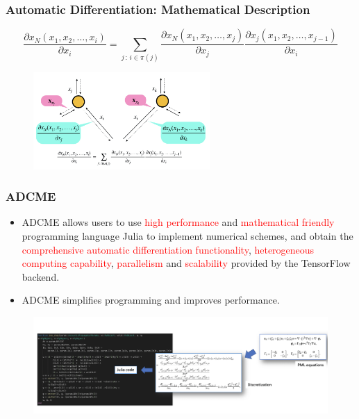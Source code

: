 \documentclass{beamer}
\begin{document}
\begin{frame}
	\frametitle{Automatic Differentiation: Mathematical Description}
\begin{theorem}
	$$\frac{\partial x_N(x_1, x_2, \ldots, x_{i})}{\partial x_i} = \sum_{j\,:\,i\in \pi(j)}
    \frac{\partial x_N(x_1, x_2, \ldots, x_j)}{\partial x_j}
    \frac{\partial x_j(x_1, x_2, \ldots, x_{j-1})}{\partial x_i}$$
\end{theorem}
\begin{figure}[hbt]
  \includegraphics[width=0.6\textwidth]{../cg2}
\end{figure}
	
\end{frame}


\begin{frame}
	\frametitle{ADCME}
	\begin{itemize}
		\item ADCME allows users to use \textcolor{red}{high performance} and \textcolor{red}{mathematical friendly} programming language Julia to implement numerical schemes, and obtain the \textcolor{red}{comprehensive automatic differentiation functionality}, \textcolor{red}{heterogeneous computing capability}, \textcolor{red}{parallelism} and \textcolor{red}{scalability} provided by the TensorFlow backend. 
		\item ADCME simplifies programming and improves performance. 
	\end{itemize}
	\begin{figure}[hbt]
  \includegraphics[width=1.0\textwidth]{../Julia.png}
\end{figure}
\end{frame}
\end{document}
